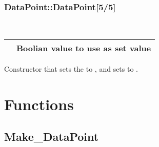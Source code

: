 \documentclass[letterpaper,10pt,english]{sphinxmanual}
\begin{document}
\subsubsection{DataPoint::DataPoint{[}5/5{]}}
\label{\detokenize{datapoint:datapoint-datapoint-5-5}}

\begin{fulllineitems}
\label{\detokenize{datapoint:_CPPv2N6pessum9DataPoint9DataPointEb}}%
\pysigstartmultiline
{}%
\pysigstopmultiline~

\begin{savenotes}\sphinxattablestart
\centering
\begin{tabulary}{\linewidth}[t]{|T|T|}
\hline

&
Boolian value to use as set value
\\
\hline
\end{tabulary}
\par
\sphinxattableend\end{savenotes}

Constructor that sets the  to , and sets
 to .

\end{fulllineitems}



\section{Functions}
\label{\detokenize{datapoint:functions}}

\subsection{Make\_DataPoint}
\label{\detokenize{datapoint:make-datapoint}}
\end{document}
